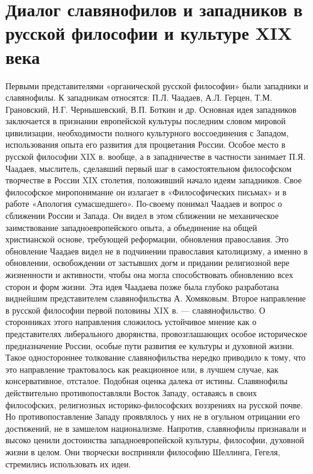 \documentclass[12pt]{article}
\begin{document}
\newpage
\section{Диалог славянофилов и западников в русской философии и культуре XIX века}
Первыми представителями «органической русской философии» были западники и славянофилы.
К западникам относятся: П.Л. Чаадаев, А.Л. Герцен, Т.М. Грановский, Н.Г. Чернышевский, В.П. Боткин и др.
Основная  идея  западников  заключается  в  признании  европейской  культуры  последним  словом  мировой
цивилизации, необходимости полного культурного воссоединения с Западом, использования опыта его развития 
для процветания России.
Особое место в русской философии XIX в. вообще, а в западничестве в частности занимает П.Я. Чаадаев,
мыслитель,  сделавший  первый  шаг  в  самостоятельном  философском  творчестве  в  России  XIX  столетия,
положивший начало идеям западников. Свое философское миропонимание он излагает в «Философических
письмах» и в работе «Апология сумасшедшего».
По-своему  понимал  Чаадаев  и  вопрос  о  сближении  России  и  Запада.  Он  видел  в  этом  сближении  не
механическое  заимствование  западноевропейского  опыта,  а  объединение  на  общей  христианской  основе,
требующей реформации, обновления православия. Это обновление Чаадаев видел не в подчинении православия
католицизму,  а  именно  в  обновлении,  освобождении  от  застывших  догм  и  придании  религиозной  вере
жизненности и активности, чтобы она могла способствовать обновлению всех сторон и форм жизни. Эта идея
Чаадаева позже была глубоко разработана виднейшим представителем славянофильства А. Хомяковым.
Второе направление в русской философии первой половины XIX в. — славянофильство. О сторонниках этого
направления сложилось устойчивое мнение как о представителях либерального дворянства, провозглашающих
особое историческое предназначение России, особые пути развития ее культуры и духовной жизни. Такое
одностороннее толкование славянофильства нередко приводило к тому, что это направление трактовалось как
реакционное  или,  в  лучшем  случае,  как  консервативное,  отсталое.  Подобная  оценка  далека  от  истины.
Славянофилы  действительно  противопоставляли  Восток  Западу,  оставаясь  в  своих  философских,
религиозных историко-философских воззрениях на русской почве. Но противопоставление Западу проявлялось
у  них  не  в  огульном  отрицании  его  достижений,  не  в  замшелом  национализме.  Напротив,  славянофилы
признавали и высоко ценили достоинства западноевропейской культуры, философии, духовной жизни в целом.
Они творчески восприняли философию Шеллинга, Гегеля, стремились использовать их идеи.
\end{document}
